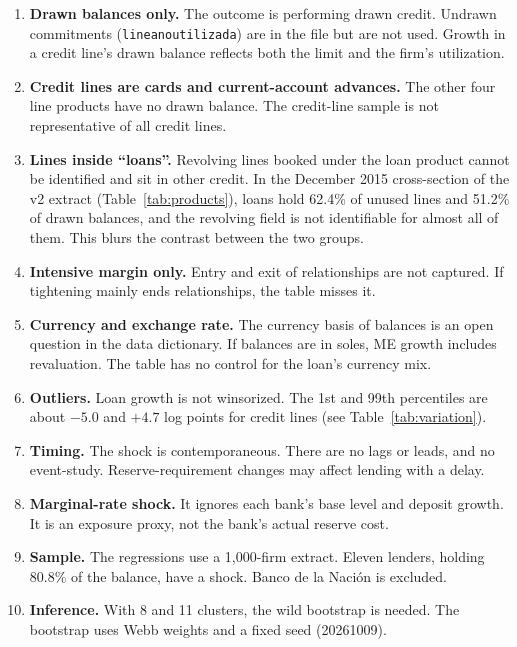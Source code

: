 \documentclass[11pt]{article}
\newcommand{\code}[1]{\texttt{#1}}
\renewcommand{\_}{\origunderscore\hspace{0pt}}  %
\begin{document}
\begin{enumerate}
\item \textbf{Drawn balances only.} The outcome is performing drawn credit. Undrawn commitments (\code{linea\_no\_utilizada}) are in the file but are not used. Growth in a credit line's drawn balance reflects both the limit and the firm's utilization.
\item \textbf{Credit lines are cards and current-account advances.} The other four line products have no drawn balance. The credit-line sample is not representative of all credit lines.
\item \textbf{Lines inside ``loans''.} Revolving lines booked under the loan product cannot be identified and sit in other credit. In the December 2015 cross-section of the v2 extract (Table~\ref{tab:products}), loans hold 62.4\% of unused lines and 51.2\% of drawn balances, and the revolving field is not identifiable for almost all of them. This blurs the contrast between the two groups.
\item \textbf{Intensive margin only.} Entry and exit of relationships are not captured. If tightening mainly ends relationships, the table misses it.
\item \textbf{Currency and exchange rate.} The currency basis of balances is an open question in the data dictionary. If balances are in soles, ME growth includes revaluation. The table has no control for the loan's currency mix.
\item \textbf{Outliers.} Loan growth is not winsorized. The 1st and 99th percentiles are about $-5.0$ and $+4.7$ log points for credit lines (see Table~\ref{tab:variation}).
\item \textbf{Timing.} The shock is contemporaneous. There are no lags or leads, and no event-study. Reserve-requirement changes may affect lending with a delay.
\item \textbf{Marginal-rate shock.} It ignores each bank's base level and deposit growth. It is an exposure proxy, not the bank's actual reserve cost.
\item \textbf{Sample.} The regressions use a 1,000-firm extract. Eleven lenders, holding 80.8\% of the balance, have a shock. Banco de la Naci\'on is excluded.
\item \textbf{Inference.} With 8 and 11 clusters, the wild bootstrap is needed. The bootstrap uses Webb weights and a fixed seed (20261009).
\end{enumerate}

\appendix
\end{document}

